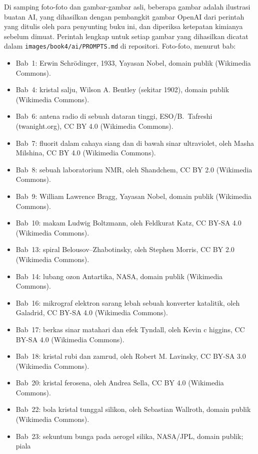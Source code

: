 \bigskip
Di samping foto-foto dan gambar-gambar asli, beberapa gambar adalah
ilustrasi buatan AI, yang dihasilkan dengan pembangkit gambar OpenAI dari
perintah yang ditulis oleh para penyunting buku ini, dan diperiksa
ketepatan kimianya sebelum dimuat. Perintah lengkap untuk setiap gambar
yang dihasilkan dicatat dalam \texttt{images/book4/ai/PROMPTS.md} di
repositori.
\bigskip
\noindent Foto-foto, menurut bab:
\begin{itemize}\small
  \item Bab~1: Erwin Schr\"odinger, 1933, Yayasan Nobel, domain publik
        (Wikimedia Commons).
  \item Bab~4: kristal salju, Wilson A. Bentley (sekitar 1902), domain publik
        (Wikimedia Commons).
  \item Bab~6: antena radio di sebuah dataran tinggi, ESO/B.~Tafreshi
        (twanight.org), CC BY 4.0 (Wikimedia Commons).
  \item Bab~7: fluorit dalam cahaya siang dan di bawah sinar ultraviolet, oleh Masha
        Milshina, CC BY 4.0 (Wikimedia Commons).
  \item Bab~8: sebuah laboratorium NMR, oleh Shandchem, CC BY 2.0 (Wikimedia
        Commons).
  \item Bab~9: William Lawrence Bragg, Yayasan Nobel, domain publik
        (Wikimedia Commons).
  \item Bab~10: makam Ludwig Boltzmann, oleh Feldkurat Katz,
        CC BY-SA 4.0 (Wikimedia Commons).
  \item Bab~13: spiral Belousov--Zhabotinsky, oleh Stephen Morris, CC BY 2.0
        (Wikimedia Commons).
  \item Bab~14: lubang ozon Antartika, NASA, domain publik (Wikimedia
        Commons).
  \item Bab~16: mikrograf elektron sarang lebah sebuah konverter katalitik, oleh
        Galadrid, CC BY-SA 4.0 (Wikimedia Commons).
  \item Bab~17: berkas sinar matahari dan efek Tyndall, oleh Kevin c higgins, CC BY-SA 4.0
        (Wikimedia Commons).
  \item Bab~18: kristal rubi dan zamrud, oleh Robert M. Lavinsky, CC BY-SA 3.0
        (Wikimedia Commons).
  \item Bab~20: kristal ferosena, oleh Andrea Sella, CC BY 4.0 (Wikimedia
        Commons).
  \item Bab~22: bola kristal tunggal silikon, oleh Sebastian Wallroth, domain
        publik (Wikimedia Commons).
  \item Bab~23: sekuntum bunga pada aerogel silika, NASA/JPL, domain publik; piala

\end{itemize}
